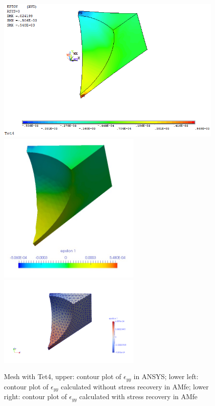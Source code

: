 \begin{figure}[htbp]
	\begin{center}
		\includegraphics[width=13cm,clip]{Tet4Eyy.png} 		
		\includegraphics[width=7cm,clip]{Tet4EyyPD.png} 
		\includegraphics[width=7cm,clip]{Tet4EyyP.png} 		
		\caption{Mesh with Tet4, upper: contour plot of $\epsilon_{yy}$ in ANSYS; lower left: contour plot of $\epsilon_{yy}$ calculated without stress recovery in AMfe; lower right: contour plot of $\epsilon_{yy}$ calculated with stress recovery in AMfe} \label{fig: Tet4_Eyy}
	\end{center}
\end{figure}
\clearpage 

